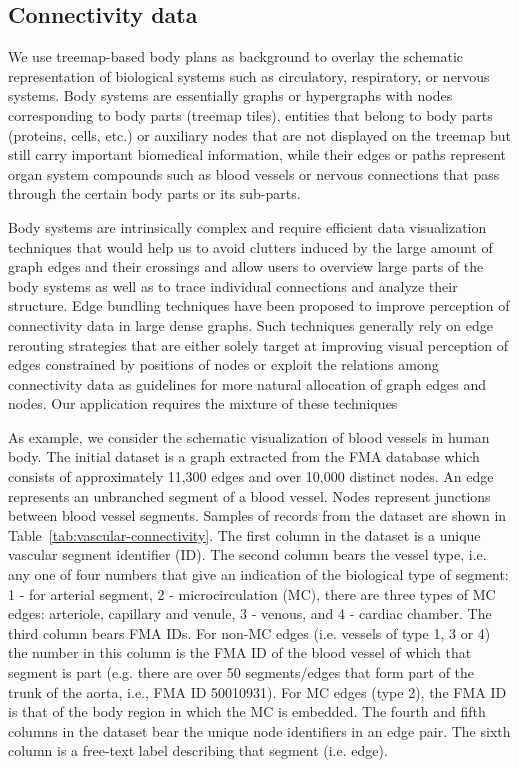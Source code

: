 \subsection{Connectivity data}

We use treemap-based body plans as background to overlay the schematic representation of biological systems such as 
circulatory, respiratory, or nervous systems. Body systems are essentially graphs or hypergraphs with nodes corresponding to body parts (treemap tiles), entities that belong to body parts (proteins, cells, etc.) or auxiliary nodes that are not displayed on the treemap but still carry important biomedical information, while their edges or paths represent organ system compounds such as blood vessels or nervous connections that pass through the certain body parts or its sub-parts.

Body systems are intrinsically complex and require efficient data visualization techniques that would help us to avoid clutters induced by the large amount of graph edges and their crossings and allow users to overview large parts of the body systems as well as to trace individual connections and analyze their structure. Edge bundling techniques have been proposed to improve perception of connectivity data in large dense graphs.
Such techniques generally rely on edge rerouting strategies that are either solely target at improving visual perception of edges constrained by positions of nodes or exploit the relations among connectivity data as guidelines for more natural allocation of graph edges and nodes. Our application requires the mixture of these techniques

As example, we consider the schematic visualization of blood vessels in human body.
The initial dataset is a graph extracted from the FMA database which consists of approximately 11,300 edges and over 10,000 distinct nodes. 
An edge represents an unbranched segment of a blood vessel. Nodes represent junctions between blood vessel segments. 
Samples of records from the dataset are shown in Table~\ref{tab:vascular-connectivity}. The first column in the dataset is a unique vascular segment identifier (ID). The second column bears the vessel type, i.e. any one of four numbers that give an indication of the biological type of segment:
1 - for arterial segment, 2 - microcirculation (MC), there are three types of MC edges: arteriole, capillary and venule, 3 - venous, and 4 - cardiac chamber.
The third column bears FMA IDs. For non-MC edges (i.e. vessels of type 1, 3 or 4) the number in this column is the FMA ID of the blood vessel of
which that segment is part (e.g. there are over 50 segments/edges that form part of the trunk of the aorta, i.e., FMA ID 50010931). For MC edges (type 2), the FMA ID is that of the body region in which the MC is embedded. The fourth and fifth columns in the dataset bear the unique node identifiers in an edge pair.
The sixth column is a free-text label describing that segment (i.e. edge).

